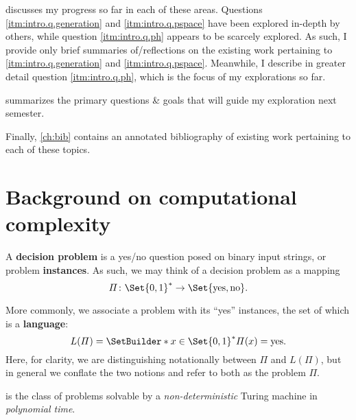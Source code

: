  discusses my progress so far in each of these areas.
Questions \ref{itm:intro.q.generation} and \ref{itm:intro.q.pspace} have been
explored in-depth by others, while question \ref{itm:intro.q.ph} appears to be
scarcely explored.  As such, I provide only brief summaries of/reflections on
the existing work pertaining to \ref{itm:intro.q.generation} and
\ref{itm:intro.q.pspace}.  Meanwhile, I describe in greater detail question
\ref{itm:intro.q.ph}, which is the focus of my explorations so far.

 summarizes the primary questions \& goals that will guide
my exploration next semester.

Finally, \cref{ch:bib} contains an annotated bibliography of existing work
pertaining to each of these topics.

\section{Background on computational complexity}


\begin{definition}%
  A \textbf{decision problem} is a yes/no question posed on binary input
  strings, or problem \textbf{instances}.  As such, we may think of a decision
  problem as a mapping
  \[
    \Pi \colon \Set{0, 1}^* \to \Set{\text{yes}, \text{no}}.
  \]

  More commonly, we associate a problem with its ``yes'' instances, the set of
  which is a \textbf{language}:
  \[
    L(\Pi) = \SetBuilder* {x \in \Set{0, 1}^*} {\Pi(x) = \text{yes}}.
  \]
  Here, for clarity, we are distinguishing notationally between \(\Pi\) and
  \(L(\Pi)\), but in general we conflate the two notions and refer to both as
  the problem \(\Pi\).
\end{definition}

\begin{definition}[\NP]
  \NP{} is the class of problems solvable by a \emph{non-deterministic} Turing
  machine in \emph{polynomial time}.
\end{definition}




